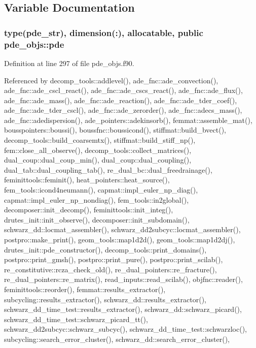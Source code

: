 \subsection{Variable Documentation}
\subsubsection[{pde}]{\setlength{\rightskip}{0pt plus 5cm}type({\bf pde\+\_\+str}), dimension(\+:), allocatable, public pde\+\_\+objs\+::pde}\label{namespacepde__objs_ac7f502a66d87d5e3abad1d8c94022aca}


Definition at line 297 of file pde\+\_\+objs.\+f90.



Referenced by decomp\+\_\+tools\+::addlevel(), ade\+\_\+fnc\+::ade\+\_\+convection(), ade\+\_\+fnc\+::ade\+\_\+cscl\+\_\+react(), ade\+\_\+fnc\+::ade\+\_\+cscs\+\_\+react(), ade\+\_\+fnc\+::ade\+\_\+flux(), ade\+\_\+fnc\+::ade\+\_\+mass(), ade\+\_\+fnc\+::ade\+\_\+reaction(), ade\+\_\+fnc\+::ade\+\_\+tder\+\_\+coef(), ade\+\_\+fnc\+::ade\+\_\+tder\+\_\+cscl(), ade\+\_\+fnc\+::ade\+\_\+zerorder(), ade\+\_\+fnc\+::adecs\+\_\+mass(), ade\+\_\+fnc\+::adedispersion(), ade\+\_\+pointers\+::adekinsorb(), femmat\+::assemble\+\_\+mat(), bousspointers\+::boussi(), boussfnc\+::boussicond(), stiffmat\+::build\+\_\+bvect(), decomp\+\_\+tools\+::build\+\_\+coarsemtx(), stiffmat\+::build\+\_\+stiff\+\_\+np(), fem\+::close\+\_\+all\+\_\+observe(), decomp\+\_\+tools\+::collect\+\_\+matrices(), dual\+\_\+coup\+::dual\+\_\+coup\+\_\+min(), dual\+\_\+coup\+::dual\+\_\+coupling(), dual\+\_\+tab\+::dual\+\_\+coupling\+\_\+tab(), re\+\_\+dual\+\_\+bc\+::dual\+\_\+freedrainage(), feminittools\+::feminit(), heat\+\_\+pointers\+::heat\+\_\+source(), fem\+\_\+tools\+::icond4neumann(), capmat\+::impl\+\_\+euler\+\_\+np\+\_\+diag(), capmat\+::impl\+\_\+euler\+\_\+np\+\_\+nondiag(), fem\+\_\+tools\+::in2global(), decomposer\+::init\+\_\+decomp(), feminittools\+::init\+\_\+integ(), drutes\+\_\+init\+::init\+\_\+observe(), decomposer\+::init\+\_\+subdomain(), schwarz\+\_\+dd\+::locmat\+\_\+assembler(), schwarz\+\_\+dd2subcyc\+::locmat\+\_\+assembler(), postpro\+::make\+\_\+print(), geom\+\_\+tools\+::map1d2d(), geom\+\_\+tools\+::map1d2dj(), drutes\+\_\+init\+::pde\+\_\+constructor(), decomp\+\_\+tools\+::print\+\_\+domains(), postpro\+::print\+\_\+gmsh(), postpro\+::print\+\_\+pure(), postpro\+::print\+\_\+scilab(), re\+\_\+constitutive\+::rcza\+\_\+check\+\_\+old(), re\+\_\+dual\+\_\+pointers\+::re\+\_\+fracture(), re\+\_\+dual\+\_\+pointers\+::re\+\_\+matrix(), read\+\_\+inputs\+::read\+\_\+scilab(), objfnc\+::reader(), feminittools\+::reorder(), femmat\+::results\+\_\+extractor(), subcycling\+::results\+\_\+extractor(), schwarz\+\_\+dd\+::results\+\_\+extractor(), schwarz\+\_\+dd\+\_\+time\+\_\+test\+::results\+\_\+extractor(), schwarz\+\_\+dd\+::schwarz\+\_\+picard(), schwarz\+\_\+dd\+\_\+time\+\_\+test\+::schwarz\+\_\+picard\+\_\+tt(), schwarz\+\_\+dd2subcyc\+::schwarz\+\_\+subcyc(), schwarz\+\_\+dd\+\_\+time\+\_\+test\+::schwarzloc(), subcycling\+::search\+\_\+error\+\_\+cluster(), schwarz\+\_\+dd\+::search\+\_\+error\+\_\+cluster(), 
